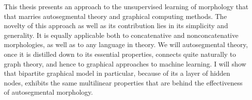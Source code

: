 This thesis presents an approach to the unsupervised learning of morphology that 
that marries autosegmental theory \citep{mccarthy:1981} and graphical computing methods. The novelty of this approach as well as its contribution lies in its simplicity and generality. It is equally applicable both to concatenative and nonconcatenative morphologies, as well as to any language in theory. We will autosegmental theory, once it is distilled down to its essential properties, connects quite naturally to graph theory, and hence to graphical approaches to machine learning. I will show that bipartite graphical model in particular, because of its a layer of hidden nodes, exhibits the same multilinear properties that are behind the effectiveness of autosegmental morphology. 

%
%


